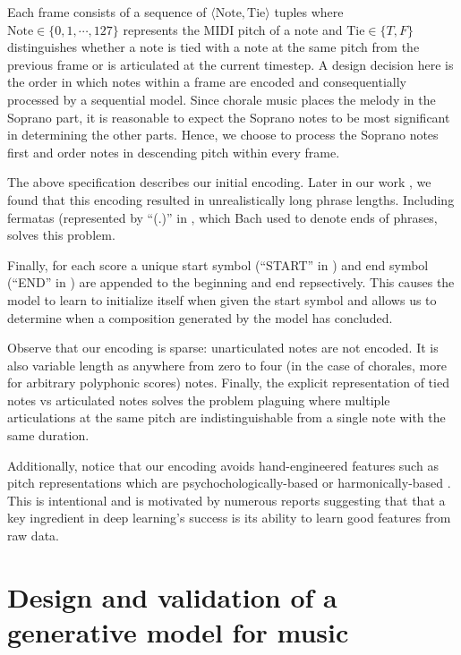 Each frame consists of a sequence of $\langle \text{Note}, \text{Tie} \rangle$
tuples where $\text{Note} \in \{0,1,\cdots,127\}$ represents the MIDI pitch of
a note and $\text{Tie} \in \{T,F\}$ distinguishes whether a note is tied with a
note at the same pitch from the previous frame or is articulated at the current
timestep. A design decision here is the order in which notes within a frame are
encoded and consequentially processed by a sequential model. Since chorale
music places the melody in the Soprano part, it is reasonable to expect the
Soprano notes to be most significant in determining the other parts. Hence, we
choose to process the Soprano notes first and order notes in descending pitch
within every frame.

The above specification describes our initial encoding. Later in our work
, we found that this encoding resulted in unrealistically long
phrase lengths. Including fermatas (represented by ``(.)'' in , which Bach used to denote ends of phrases, solves this problem.

Finally, for each score a unique start symbol (``START'' in ) and
end symbol (``END'' in ) are appended to the beginning and end
repsectively. This causes the model to learn to initialize itself when given
the start symbol and allows us to determine when a composition generated by the
model has concluded.

Observe that our encoding is sparse: unarticulated notes are not encoded. It is
also variable length as anywhere from zero to four (in the case of chorales,
more for arbitrary polyphonic scores) notes. Finally, the explicit
representation of tied notes vs articulated notes solves the problem plaguing
\citep{Eck2002}\citep{eck2008learning} \citep{Liu2014} \citep{Brien2016} where
multiple articulations at the same pitch are indistinguishable from a single
note with the same duration.

Additionally, notice that our encoding avoids hand-engineered features such as
pitch representations which are psychochologically-based \citep{mozer1994neural}
or harmonically-based \citep{franklin2004recurrent}
\citep{laden1989representation}. This is intentional and is motivated by
numerous reports \citep{bengio2009learning}\citep{Bengio2011} suggesting that
that a key ingredient in deep learning's success is its ability to learn good
features from raw data.

\section{Design and validation of a generative model for music}

